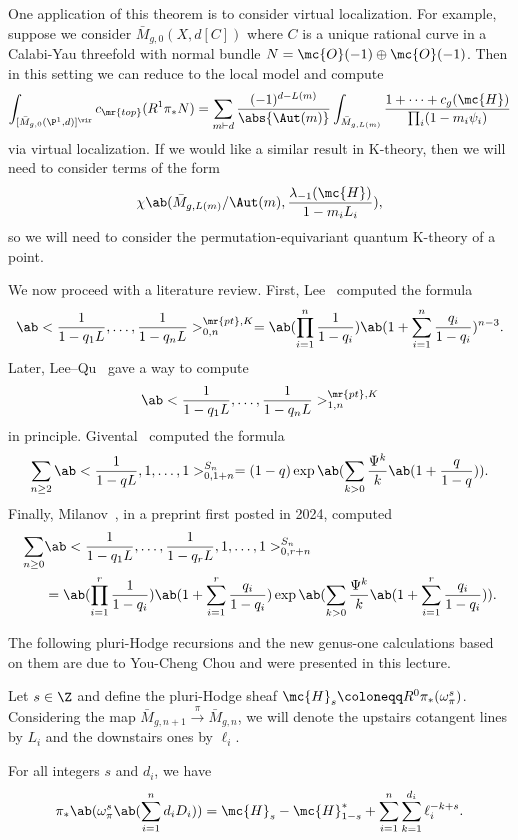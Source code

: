One application of this theorem is to consider virtual localization. For example, suppose we consider \(\bar{M}_{g,0}(X, d[C])\) where \(C\) is a unique rational curve in a Calabi-Yau threefold with normal bundle \(N = \mc{O}(-1)\oplus \mc{O}(-1)\). Then in this setting we can reduce to the local model and compute
\begin{align*}
    \int_{[\bar{M}_{g,0}(\P^1, d)]^{\vir}} c_{\mr{top}}(R^1 \pi_* N) = \sum_{m \vdash d} \frac{(-1)^{d-L(m)}}{\abs{\Aut(m)}} \int_{\bar{M}_{g, L(m)}} \frac{1 + \cdots + c_g(\mc{H})}{\prod_i (1-m_i \psi_i)}
\end{align*}
via virtual localization. If we would like a similar result in K-theory, then we will need to consider terms of the form
\[ \chi\ab(\bar{M}_{g, L(m)}/\Aut(m), \frac{\lambda_{-1}(\mc{H})}{1-m_i L_i}), \]
so we will need to consider the permutation-equivariant quantum K-theory of a point.

We now proceed with a literature review. First, Lee~\cite{Lee1997} computed the formula
\[ \ab<\frac{1}{1-q_1 L}, \ldots, \frac{1}{1-q_n L}>_{0,n}^{\mr{pt}, K} = \ab(\prod_{i=1}^n \frac{1}{1-q_i}) \ab(1 + \sum_{i=1}^n \frac{q_i}{1-q_i})^{n-3}. \]
Later, Lee--Qu~\cite{LeeQu2014} gave a way to compute
\[ \ab<\frac{1}{1-q_1 L}, \ldots, \frac{1}{1-q_n L}>_{1,n}^{\mr{pt}, K} \]
in principle. Givental~\cite{Givental2017K1} computed the formula
\[ \sum_{n \geq 2} \ab<\frac{1}{1-q L}, 1, \ldots, 1>_{0,1+n}^{S_n} = (1-q) \exp\ab(\sum_{k > 0} \frac{\Psi^k}{k} \ab(1 + \frac{q}{1-q})). \]
Finally, Milanov~\cite{Milanov2025}, in a preprint first posted in 2024, computed 
\begin{align*}
    \sum_{n \geq 0}& \ab<\frac{1}{1-q_1 L}, \ldots, \frac{1}{1-q_r L}, 1, \ldots, 1>_{0,r+n}^{S_n} \\
    &= \ab(\prod_{i=1}^{r} \frac{1}{1-q_i})\ab(1 + \sum_{i=1}^r \frac{q_i}{1-q_i}) \exp\ab(\sum_{k > 0} \frac{\Psi^k}{k} \ab(1 + \sum_{i=1}^r \frac{q_i}{1-q_i})). 
\end{align*}

The following pluri-Hodge recursions and the new genus-one calculations based on them are due to You-Cheng Chou and were presented in this lecture.

Let \(s \in \Z\) and define the pluri-Hodge sheaf \(\mc{H}_s \coloneqq R^0 \pi_* (\omega_{\pi}^s)\). Considering the map \(\bar{M}_{g,n+1} \xrightarrow{\pi} \bar{M}_{g,n}\), we will denote the upstairs cotangent lines by \(L_i\) and the downstairs ones by \(\ell_i\).

\begin{lem}
    For all integers \(s\) and \(d_i\), we have
    \[ \pi_*\ab(\omega_{\pi}^s\ab(\sum_{i=1}^n d_i D_i)) = \mc{H}_s-\mc{H}_{1-s}^* + \sum_{i=1}^n \sum_{k=1}^{d_i} \ell_i^{-k+s}. \]
\end{lem}

